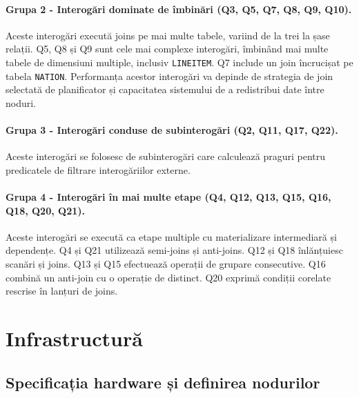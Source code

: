 \paragraph{Grupa 2 - Interogări dominate de îmbinări (Q3, Q5, Q7, Q8, Q9, Q10).} Aceste interogări execută joins pe mai multe tabele, variind de la trei la șase relații. Q5, Q8 și Q9 sunt cele mai complexe interogări, îmbinând mai multe tabele de dimensiuni multiple, inclusiv \texttt{LINEITEM}. Q7 include un join încrucișat pe tabela \texttt{NATION}. Performanța acestor interogări va depinde de strategia de join selectată de planificator și capacitatea sistemului de a redistribui date între noduri.

\paragraph{Grupa 3 - Interogări conduse de subinterogări (Q2, Q11, Q17, Q22).} Aceste interogări se folosesc de subinterogări care calculează praguri pentru predicatele de filtrare interogăriilor externe.

\paragraph{Grupa 4 - Interogări în mai multe etape (Q4, Q12, Q13, Q15, Q16, Q18, Q20, Q21).} Aceste interogări se execută ca etape multiple cu materializare intermediară și dependențe. Q4 și Q21 utilizează semi-joins și anti-joins. Q12 și Q18 înlănțuiesc scanări și joins. Q13 și Q15 efectuează operații de grupare consecutive. Q16 combină un anti-join cu o operație de distinct. Q20 exprimă condiții corelate rescrise în lanțuri de joins.

\section{Infrastructură}

\subsection{Specificația hardware și definirea nodurilor}

